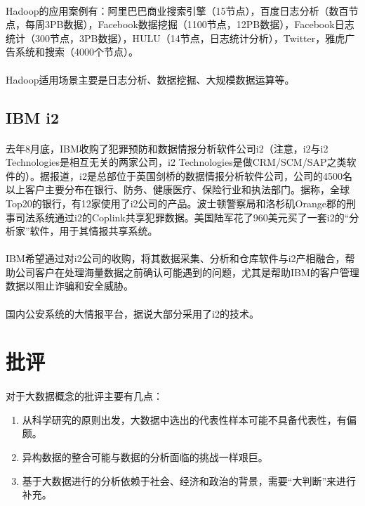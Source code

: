 \documentclass[12pt]{article}
\begin{document}
\paragraph{}
Hadoop的应用案例有：阿里巴巴商业搜索引擎（15节点），百度日志分析（数百节点，每周3PB数据），Facebook数据挖掘（1100节点，12PB数据），Facebook日志统计（300节点，3PB数据），HULU（14节点，日志统计分析），Twitter，雅虎广告系统和搜索（4000个节点）。
\paragraph{}
Hadoop适用场景主要是日志分析、数据挖掘、大规模数据运算等。

\subsection{IBM i2}
\paragraph{}
去年8月底，IBM收购了犯罪预防和数据情报分析软件公司i2（注意，i2与i2 Technologies是相互无关的两家公司，i2 Technologies是做CRM/SCM/SAP之类软件的）。据报道，i2是总部位于英国剑桥的数据情报分析软件公司，公司的4500名以上客户主要分布在银行、防务、健康医疗、保险行业和执法部门。据称，全球Top20的银行，有12家使用了i2公司的产品。波士顿警察局和洛杉矶Orange郡的刑事司法系统通过i2的Coplink共享犯罪数据。美国陆军花了960美元买了一套i2的“分析家”软件，用于其情报共享系统。
\paragraph{}
IBM希望通过对i2公司的收购，将其数据采集、分析和仓库软件与i2产相融合，帮助公司客户在处理海量数据之前确认可能遇到的问题，尤其是帮助IBM的客户管理数据以阻止诈骗和安全威胁。 
\paragraph{}
国内公安系统的大情报平台，据说大部分采用了i2的技术。

\newpage

\section{批评}
\paragraph{}
对于大数据概念的批评主要有几点：
\begin{enumerate}
\item
从科学研究的原则出发，大数据中选出的代表性样本可能不具备代表性，有偏颇。
\item
异构数据的整合可能与数据的分析面临的挑战一样艰巨。
\item
基于大数据进行的分析依赖于社会、经济和政治的背景，需要“大判断”来进行补充。

\end{enumerate}
\end{document}
